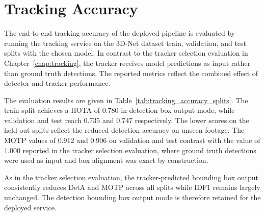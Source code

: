 \documentclass[12pt,oneside,bibtotoc,liststotoc]{scrbook}
\begin{document}
\vspace{-2em}
\section{Tracking Accuracy}
\vspace{-0.5em}

The end-to-end tracking accuracy of the deployed pipeline is evaluated by running the
tracking service on the 3D-Net dataset train, validation, and test splits with
the chosen model. In contrast to the tracker selection evaluation in
Chapter~\ref{chap:tracking}, the tracker receives model predictions as input rather
than ground truth detections. The reported metrics reflect the combined effect of
detector and tracker performance.

The evaluation results are given in Table~\ref{tab:tracking_accuracy_splits}. The train split
achieves a HOTA of 0.780 in detection box output mode, while validation and test reach 0.735
and 0.747 respectively. The lower scores on the held-out splits reflect the reduced detection
accuracy on unseen footage. The MOTP values of 0.912 and 0.906 on validation and test contrast
with the value of 1.000 reported in the tracker selection evaluation, where ground truth
detections were used as input and box alignment was exact by construction.

As in the tracker selection evaluation, the tracker-predicted bounding box output consistently
reduces DetA and MOTP across all splits while IDF1 remains largely unchanged. The detection
bounding box output mode is therefore retained for the deployed service.
\end{document}
